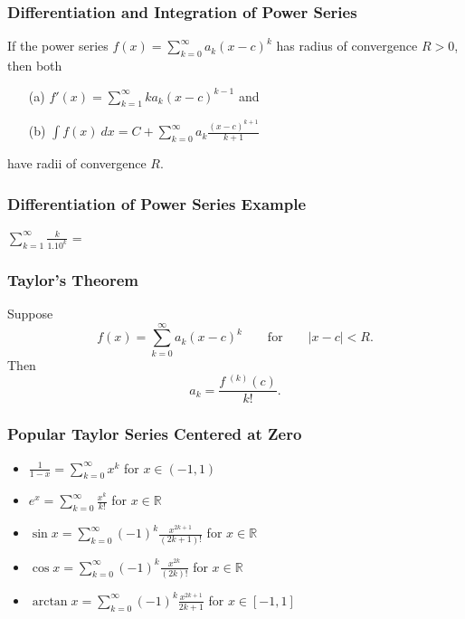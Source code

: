 \documentclass{beamer}
\begin{document}
\begin{frame}
\frametitle{Differentiation and Integration of Power Series}
\begin{Theorem}
If the power series $f(x) = \displaystyle\sum_{k = 0}^\infty a_k (x - c)^k$ has radius of convergence $R > 0$, then both
\begin{enumerate}
\item[(a)] $\displaystyle f' (x) = \sum_{k = 1}^\infty k a_k (x - c)^{k - 1}$ and
\item[(b)] $\displaystyle\int f(x)\ dx = C + \sum_{k = 0}^\infty a_k \frac{(x - c)^{k + 1}}{k + 1}$
\end{enumerate}
have radii of convergence $R$.
\end{Theorem}
\end{frame}

\begin{frame}[t]
\frametitle{Differentiation of Power Series Example}
\begin{Example}
$\displaystyle\sum_{k = 1}^\infty \frac{k}{1.10^k}$ = 
\end{Example}
\end{frame}

\begin{frame}
\frametitle{Taylor's Theorem}
\begin{Theorem}
Suppose
$$
f(x) = \sum_{k = 0}^\infty a_k (x - c)^k\qquad\text{for}\qquad |x - c| < R.
$$
Then
$$
a_k = \frac{f\ ^{(k)}(c)}{k!}.
$$
\end{Theorem}
\end{frame}

\begin{frame}
\frametitle{Popular Taylor Series Centered at Zero}
{\small
\begin{itemize}
\item $\displaystyle \frac{1}{1 - x} = \sum_{k = 0}^\infty x^k$ for $x\in (-1, 1)$
\item $\displaystyle e^x = \sum_{k = 0}^\infty \frac{x^k}{k!}$ for $x\in\mathbb{R}$
\item $\displaystyle\sin x = \sum_{k = 0}^\infty (-1)^k \frac{x^{2k +1}}{(2k + 1)!}$ for $x\in\mathbb{R}$
\item $\displaystyle\cos x = \sum_{k = 0}^\infty (-1)^k \frac{x^{2k}}{(2k)!}$ for $x\in\mathbb{R}$
\item $\displaystyle\arctan x = \sum_{k = 0}^\infty (-1)^k \frac{x^{2k + 1}}{2k+ 1}$ for $x\in [-1, 1]$
\end{itemize}
}

\end{frame}
\end{document}
